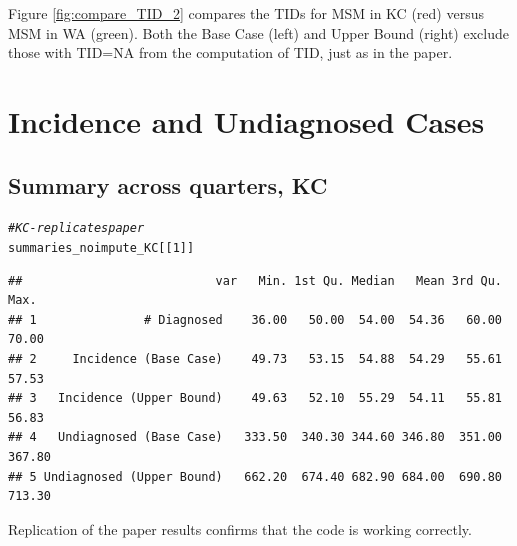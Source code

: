 \documentclass{article}\usepackage[]{graphicx}\usepackage[]{color}
\makeatletter
\newcommand{\hlnum}[1]{\textcolor[rgb]{0.686,0.059,0.569}{#1}}%
\newcommand{\hlcom}[1]{\textcolor[rgb]{0.678,0.584,0.686}{\textit{#1}}}%
\newcommand{\hlstd}[1]{\textcolor[rgb]{0.345,0.345,0.345}{#1}}%
\newenvironment{kframe}{%
 \def\at@end@of@kframe{}%
 \ifinner\ifhmode%
  \def\at@end@of@kframe{\end{minipage}}%
  \begin{minipage}{\columnwidth}%
 \fi\fi%
 \def\FrameCommand##1{\hskip\@totalleftmargin \hskip-\fboxsep
 \colorbox{shadecolor}{##1}\hskip-\fboxsep
     \hskip-\linewidth \hskip-\@totalleftmargin \hskip\columnwidth}%
 \MakeFramed {\advance\hsize-\width
   \@totalleftmargin\z@ \linewidth\hsize
   \@setminipage}}%
 {\par\unskip\endMakeFramed%
 \at@end@of@kframe}
\newenvironment{knitrout}{}{} %
\makeatother
\begin{document}
Figure \ref{fig:compare_TID_2} compares the TIDs for MSM in KC (red) versus MSM in WA (green). Both the Base Case (left) and Upper Bound (right) exclude those with TID=NA from the computation of TID, just as in the paper.
\section{Incidence and Undiagnosed Cases}

















\subsection{Summary across quarters, KC}
\begin{knitrout}\footnotesize
{}\color{fgcolor}\begin{kframe}
\begin{alltt}
\hlcom{# KC - replicates paper}
\hlstd{summaries_noimpute_KC[[}\hlnum{1}\hlstd{]]}
\end{alltt}
\begin{verbatim}
##                           var   Min. 1st Qu. Median   Mean 3rd Qu.   Max.
## 1               # Diagnosed    36.00   50.00  54.00  54.36   60.00  70.00
## 2     Incidence (Base Case)    49.73   53.15  54.88  54.29   55.61  57.53
## 3   Incidence (Upper Bound)    49.63   52.10  55.29  54.11   55.81  56.83
## 4   Undiagnosed (Base Case)   333.50  340.30 344.60 346.80  351.00 367.80
## 5 Undiagnosed (Upper Bound)   662.20  674.40 682.90 684.00  690.80 713.30
\end{verbatim}
\end{kframe}
\end{knitrout}


Replication of the paper results confirms that the code is working correctly.
\end{document}
